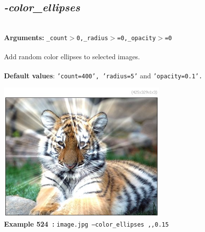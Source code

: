 \documentclass[a4paper,11pt,twoside]{book}
\begin{document}
\subsection{\emph{-color\_ellipses} }\vspace*{-0.5em}
~\\\textbf{Arguments: } 
{\small \texttt{\_count$>$0,\_radius$>$=0,\_opacity$>$=0}}\\~\\
Add random color ellipses to selected images.
~\\~\\\textbf{Default values}: {\small \texttt{'count=400', 'radius=5'} and \texttt{'opacity=0.1'.}}
\begin{center}\includegraphics[keepaspectratio=true,height=7cm,width=\textwidth]{img/gmic_def524.jpg}\\
{\footnotesize \textbf{Example 524~:} \texttt{image.jpg --color\_ellipses ,,0.15}}
\end{center}
\end{document}
